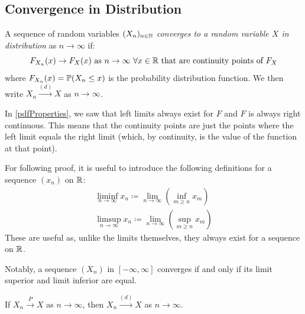 \documentclass[../main.tex]{subfiles}
\begin{document}
\subsection{Convergence in Distribution}
\begin{definition}
  A sequence of random variables $(X_n)_{n \in \N}$ \textit{converges to a random variable $X$ in distribution} as $n \to \infty$ if:
  \[
    F_{X_n}(x) \to F_X(x) \text{ as $n \to \infty$}\ \forall x \in \R \text{ that are continuity points of $F_X$}
  \]
  where $F_{X_n}(x) = \P(X_n \leq x)$ is the probability distribution function.
  We then write $X_n \xrightarrow{(d)} X$ as $n \to \infty$.
\end{definition}
\begin{remark}
  In \cref{pdfProperties}, we saw that left limits always exist for $F$ and $F$ is always right continuous.
  This means that the continuity points are just the points where the left limit equals the right limit (which, by continuity, is the value of the function at that point).
\end{remark}
\begin{remark}
  For following proof, it is useful to introduce the following definitions for a sequence $(x_n)$ on $\R$:
  \begin{align*}
    \liminf_{n \to \infty} x_n \coloneqq \lim_{n \to \infty} \left(\inf_{m \geq n} x_m\right) \\
    \limsup_{n \to \infty} x_n \coloneqq \lim_{n \to \infty} \left(\sup_{m \geq n} x_m\right)
  \end{align*}
  These are useful as, unlike the limits themselves, they always exist for a sequence on $\R$.

  Notably, a sequence $(X_n)$ in $[-\infty, \infty]$ converges if and only if its limit superior and limit inferior are equal.
\end{remark}
\begin{proposition}
  If $X_n \xrightarrow{P} X$  as $n \to \infty$, then $X_n \xrightarrow{(d)} X$ as $n \to \infty$.
\end{proposition}
\end{document}
